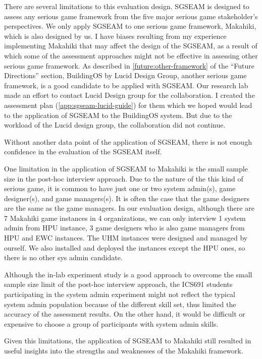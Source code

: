 There are several limitations to this evaluation design. SGSEAM is designed to assess any serious game framework from the five major serious game stakeholder's perspectives. We only apply SGSEAM to one serious game framework, Makahiki, which is also designed by us. I have biases resulting from my experience implementing Makahiki that may affect the design of the SGSEAM, as a result of which some of the assessment approaches might not be effective in assessing other serious game framework. As described in \autoref{future:other-framework} of the ``Future Directions'' section, BuildingOS\cite{building-dashboard} by Lucid Design Group, another serious game framework, is a good candidate to be applied with SGSEAM. Our research lab made an effort to contact Lucid Design group for the collaboration. I created the assessment plan (\autoref{app:sgseam-lucid-guide}) for them which we hoped would lead to the application of SGSEAM to the BuildingOS system. But due to the workload of the Lucid design group, the collaboration did not continue.

Without another data point of the application of SGSEAM, there is not enough confidence in the evaluation of the SGSEAM itself. 

One limitation in the application of SGSEAM to Makahiki is the small sample size in the post-hoc interview approach. Due to the nature of the this kind of serious game, it is common to have just one or two system admin(s), game designer(s), and game managers(s). It is often the case that the game designers are the same as the game managers. In our evaluation design, although there are 7 Makahiki game instances in 4 organizations, we can only interview 1 system admin from HPU instance, 3 game designers who is also game managers from HPU and EWC instances. The UHM instances were designed and managed by ourself. We also installed and deployed the instances except the HPU ones, so there is no other sys admin candidate.  

Although the in-lab experiment study is a good approach to overcome the small sample size limit of the post-hoc interview approach, the ICS691 students participating in the system admin experiment might not reflect the typical system admin population because of the different skill set, thus limited the accuracy of the assessment results. On the other hand, it would be difficult or expensive to choose a group of participants with system admin skills.

Given this limitations, the application of SGSEAM to Makahiki still resulted in useful insights into the strengths and weaknesses of the Makahiki framework.

